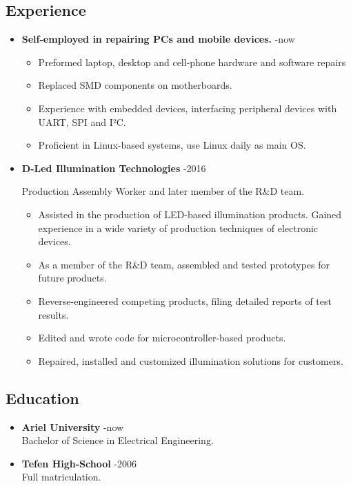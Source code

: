 \documentclass[11pt,a4paper]{article}
\begin{document}
	\subsection*{Experience}
	\begin{itemize}
		\item\textbf{Self-employed in repairing PCs and mobile devices.} -now
		\parbox[left]{0.7\textwidth}{ \begin{itemize}
				\item Preformed laptop, desktop and cell-phone hardware and software repairs
				\item Replaced SMD components on motherboards.
				\item Experience with embedded devices, interfacing peripheral devices with UART, SPI and I²C.
				\item Proficient in Linux-based systems, use Linux daily as main OS.
		\end{itemize}}
		
		
		\item\textbf{D-Led Illumination Technologies} -2016 \\
		\parbox[left]{0.7\textwidth}{Production Assembly Worker and later member of the R\&D team.
			\begin{itemize}
				\item Assisted in the production of LED-based illumination products. Gained experience in a wide variety of production techniques of electronic devices.
				\item As a member of the R\&D team, assembled and tested prototypes for future products.
				\item Reverse-engineered competing products, filing detailed reports of test results.
				\item Edited and wrote code for microcontroller-based products.
				\item Repaired, installed and customized illumination solutions for customers.
		\end{itemize}}
	\end{itemize}
	\subsection*{Education}
	\begin{itemize}
		\item \textbf{Ariel University} -now \\
		Bachelor of Science in Electrical Engineering.
		\item \textbf{Tefen High-School} -2006 \\
		Full matriculation.
	\end{itemize}
	
\end{document}
